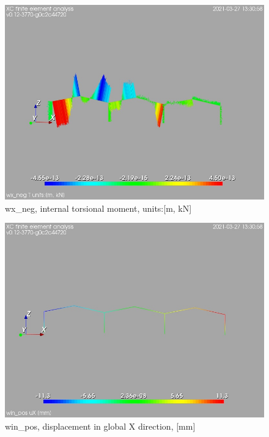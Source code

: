 \begin{figure}
\begin{center}
\includegraphics[width=\linewidth]{calc_results/sole_zeinali/text/graphics/resSimplLC/wx_negallMemberSetT}
\caption{wx_neg, internal torsional moment, units:[m, kN]}
\end{center}
\end{figure}
\cleardoublepage
\begin{figure}
\begin{center}
\includegraphics[width=\linewidth]{calc_results/sole_zeinali/text/graphics/resSimplLC/win_postotaluX}
\caption{win_pos, displacement in global X direction, [mm]}
\end{center}
\end{figure}
